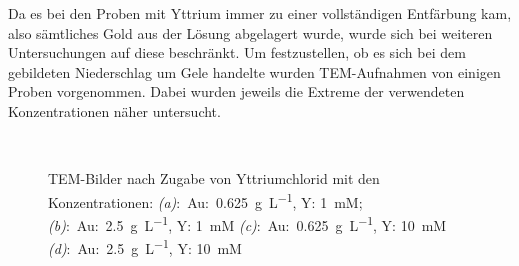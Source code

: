 		Da es bei den Proben mit Yttrium immer zu einer vollständigen Entfärbung kam, also sämtliches Gold aus der Lösung abgelagert wurde, wurde sich bei weiteren Untersuchungen auf diese beschränkt.
		Um festzustellen, ob es sich bei dem gebildeten Niederschlag um Gele handelte wurden TEM-Aufnahmen von einigen Proben vorgenommen.
		Dabei wurden jeweils die Extreme der verwendeten Konzentrationen näher untersucht.
		
		\begin{figure}[htbp]
			\centering
			\\
			\caption{TEM-Bilder nach Zugabe von Yttriumchlorid mit den Konzentrationen: \emph{(a)}:~Au:~\SI{0,625}{\gram\per\liter}, Y: 1~mM;
			\emph{(b)}:~Au:~\SI{2,5}{\gram\per\liter}, Y: 1~mM
			\emph{(c)}:~Au:~\SI{0,625}{\gram\per\liter}, Y: 10~mM
			\emph{(d)}:~Au:~\SI{2,5}{\gram\per\liter}, Y: 10~mM} 
			\label{fig:Y-Gele}
		\end{figure}
		
